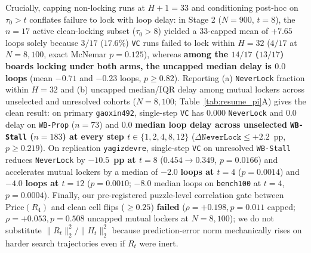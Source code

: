 \documentclass[10pt,letterpaper]{article}
\begin{document}
Crucially, capping non-locking runs at $H+1 = 33$ and conditioning post-hoc on $\tau_0 > t$ conflates failure to lock with loop delay: in Stage 2 ($N=900$, $t=8$), the $n=17$ active clean-locking subset ($\tau_0 > 8$) yielded a $33$-capped mean of $+7.65$ loops solely because $3/17$ ($17.6\%$) \texttt{VC} runs failed to lock within $H=32$ ($4/17$ at $N=8{,}100$, exact McNemar $p=0.125$), whereas \textbf{among the $14/17$ ($13/17$) boards locking under both arms, the uncapped median delay is $0.0$ loops} (mean $-0.71$ and $-0.23$ loops, $p \ge 0.82$). Reporting (a) \texttt{NeverLock} fraction within $H=32$ and (b) uncapped median/IQR delay among mutual lockers across unselected and unresolved cohorts ($N=8{,}100$; Table~\ref{tab:resume_pi}A) gives the clean result: on primary \texttt{gaoxin492}, single-step \texttt{VC} has $0.000$ \texttt{NeverLock} and $0.0$ delay on \texttt{WB-Prop} ($n=73$) and $\mathbf{0.0}$ \textbf{median loop delay across unselected \texttt{WB-Stall} ($n=183$) at every step $t \in \{1,2,4,8,12\}$} ($\Delta\texttt{NeverLock} \le +2.2$~pp, $p \ge 0.219$). On replication \texttt{yagizdevre}, single-step \texttt{VC} on unresolved \texttt{WB-Stall} reduces \texttt{NeverLock} by $\mathbf{-10.5}$~\textbf{pp at $t=8$} ($0.454 \to 0.349$, $p=0.0166$) and accelerates mutual lockers by a median of $\mathbf{-2.0}$ \textbf{loops at $t=4$} ($p=0.0014$) and $\mathbf{-4.0}$ \textbf{loops at $t=12$} ($p=0.0010$; $-8.0$ median loops on \texttt{bench100} at $t=4$, $p=0.0004$). Finally, our pre-registered puzzle-level correlation gate between $\mathrm{Price}(R_4)$ and clean cell flips ($\ge 0.25$) \textbf{failed} ($\rho = +0.198, p=0.011$ capped; $\rho = +0.053, p=0.508$ uncapped mutual lockers at $N=8{,}100$); we do not substitute $\|R_t\|_2^2 / \|H_t\|_2^2$ because prediction-error norm mechanically rises on harder search trajectories even if $R_t$ were inert.
\end{document}
